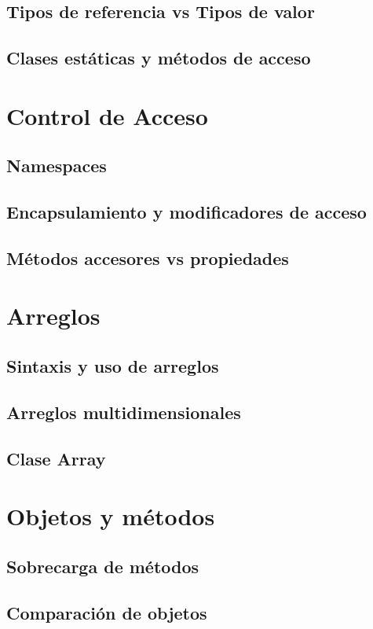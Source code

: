 \documentclass[12pt,a4paper]{report}
\begin{document}
{\section{Tipos de referencia vs Tipos de valor}
\section{Clases estáticas y métodos de acceso}

\chapter{Control de Acceso}
\section{Namespaces}
\section{Encapsulamiento y modificadores de acceso}
\section{Métodos accesores vs propiedades}

\chapter{Arreglos}
\section{Sintaxis y uso de arreglos}
\section{Arreglos multidimensionales}
\section{Clase Array}

\chapter{Objetos y métodos}
\section{Sobrecarga de métodos}
\section{Comparación de objetos}
}
\end{document}
